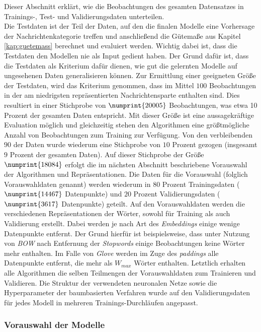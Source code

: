 \documentclass[a4paper,11pt]{article}
\begin{document}
Dieser Abschnitt erklärt, wie die  Beobachtungen des gesamten Datensatzes in Trainings-, Test- und Validierungsdaten unterteilen.\\
Die Testdaten ist der Teil der Daten, auf den die finalen Modelle eine Vorhersage der Nachrichtenkategorie treffen und anschließend die Gütemaße aus Kapitel \ref{kap:guetemass} berechnet und evaluiert werden. Wichtig dabei ist, dass die Testdaten den Modellen nie als Input gedient haben. Der Grund dafür ist, dass die Testdaten als Kriterium dafür dienen, wie gut die gelernten Modelle auf ungesehenen Daten generalisieren können. Zur Ermittlung einer geeigneten Größe der Testdaten, wird das Kriterium genommen, dass im Mittel $100$ Beobachtungen in der am niedrigsten repräsentierten Nachrichtensparte enthalten sind. Dies resultiert in einer Stichprobe von $\numprint{20005}$ Beobachtungen, was etwa 10 Prozent der gesamten Daten entspricht. Mit dieser Größe ist eine aussagekräftige Evaluation möglich und gleichzeitig stehen den Algorithmen eine größtmögliche Anzahl von Beobachtungen zum Training zur Verfügung. Von den verbleibenden $90$ der Daten wurde wiederum eine Stichprobe von $10$ Prozent gezogen (insgesamt $9$ Prozent der gesamten Daten). Auf dieser Stichprobe der Größe $\numprint{18084}$ erfolgt die im nächsten Abschnitt beschriebene Vorauswahl der Algorithmen und Repräsentationen. Die Daten für die Vorauswahl (folglich Vorauswahldaten genannt) werden wiederum in $80$ Prozent Trainingsdaten ($\numprint{14467}$ Datenpunkte) und $20$ Prozent  Validierungsdaten ($\numprint{3617}$ Datenpunkte) geteilt. Auf den Vorauswahldaten werden die verschiedenen Repräsentationen der Wörter, sowohl für Training als auch Validierung erstellt. Dabei werden je nach Art des \textit{Embeddings} einige wenige Datenpunkte entfernt. Der Grund hierfür ist beispielsweise, dass  unter Nutzung von \textit{BOW} nach Entfernung der \textit{Stopwords} einige Beobachtungen keine Wörter mehr enthalten. Im Falle von \textit{Glove} werden im Zuge des \textit{paddings} alle Datenpunkte entfernt, die mehr als $W_{max}$ Wörter enthalten.
Letztlich erhalten alle Algorithmen die selben Teilmengen der Vorauswahldaten zum Trainieren und Validieren. Die Struktur der verwendeten neuronalen Netze sowie die Hyperparameter der baumbasierten Verfahren wurde auf den Validierungsdaten für jedes Modell in mehreren Trainings-Durchläufen angepasst.

\subsubsection{Vorauswahl der Modelle}\label{kap:preselection}
\end{document}
